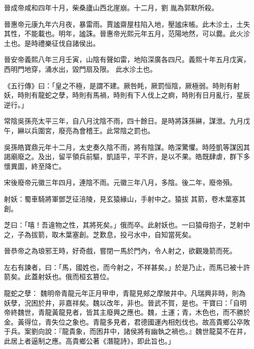 \begin{pinyinscope}
 晉成帝咸和四年十月，柴桑廬山西北崖崩。十二月，劉
 胤為郭默所殺。



 晉惠帝元康九年六月夜，暴雷雨。賈謐齋屋柱陷入地，壓謐床帳。此木沴土，土失其性，不能載也。明年，謐誅。晉惠帝光熙元年五月，范陽地然，可以爨。此火沴土也。是時禮樂征伐自諸侯出。



 晉安帝義熙八年三月壬寅，山陰有聲如雷，地陷深廣各四尺。義熙十年五月戊寅，西明門地穿，涌水出，毀門扇及限。
 此水沴土也。



 《五行傳》曰：「皇之不極，是謂不建。厥咎眊，厥罰恒陰，厥極弱。時則有射妖，時則有龍蛇之孽，時則有馬禍，時則有下人伐上之痾，時則有日月亂行，星辰逆行。」



 常陰吳孫亮太平三年，自八月沈陰不雨，四十餘日。是時將誅孫綝，謀泄。九月戊午，綝以兵圍宮，廢亮為會稽王。此常陰之罰也。



 吳孫皓寶鼎元年十二月，太史奏久陰不雨，將有陰謀。皓深驚懼。時陸凱等謀因其謁廟廢之。及出，留平領兵前驅，凱語平，平不許，是以不果。皓既肆虐，群下多懷異圖，終至降亡。



 宋後廢帝元徽三年四月，連陰不雨。元徽三年八月，多陰。後二年，廢帝殞。



 射妖：蜀車騎將軍鄧芝征涪陵，見玄猿緣山，手射中之。猿拔
 其箭，卷木葉塞其創。



 芝曰：「嘻！吾違物之性，其將死矣。」俄而卒。此射妖也。一曰猿母抱子，芝射中之，子為拔箭，取木葉塞創。芝歎息，投弓水中，自知當死矣。



 晉恭帝之為琅邪王時，好奇戲，嘗閉一馬於門內，令人射之，欲觀幾箭而死。



 左右有諫者，曰：「馬，國姓也，而今射之，不祥甚矣。」於是乃止，而馬已被十許箭矣。此蓋射妖也。俄而桓玄篡位。



 龍蛇之孽：
 魏明帝青龍元年正月甲申，青龍見郟之摩陂井中。凡瑞興非時，則為妖孽，況困於井，非嘉祥矣。魏以改年，非也。晉武不賀，是也。干寶曰：「自明帝終魏世，青龍黃龍見者，皆其主廢興之應也。魏，土運；青，木色也，而不勝於金。黃得位，青失位之象也。青龍多見者，君德國運內相剋伐也。故高貴鄉公卒敗于兵。案劉向說：『龍貴象，而困井中，諸侯將有幽執之禍也。』魏世龍莫不在井，此居上者逼制之應。高貴鄉公著《潛龍詩》，即此旨也。」




\end{pinyinscope}
